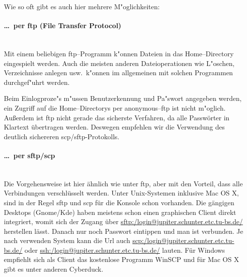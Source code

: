 Wie so oft gibt es auch hier mehrere M"oglichkeiten: 

\paragraph{\dots\ per  ftp (File Transfer Protocol)} \ \\
Mit einem beliebigen \glossar ftp--Programm k"onnen Dateien in das
\glossar Home--Directory eingespielt werden. Auch die meisten anderen
Dateioperationen wie L"oschen, Verzeichnisse anlegen usw.\  k"onnen im
allgemeinen mit solchen Programmen durchgef"uhrt werden.

Beim Einlogproze"s m"ussen Benutzerkennung und Pa"swort angegeben werden, ein
Zugriff auf die \glossar Home--Directorys per anonymous--ftp ist nicht
m"oglich. Außerdem ist ftp nicht gerade das sicherste Verfahren, da
alle Passwörter in Klartext übertragen werden. Deswegen empfehlen wir
die Verwendung des deutlich sichereren scp/sftp-Protokolls.
\paragraph{\dots\ per sftp/scp} \ \\
Die Vorgehensweise ist hier ähnlich wie unter ftp, aber mit den
Vorteil, dass alle Verbindungen verschlüsselt werden. Unter
Unix-Systemen inklusive Mac OS X, sind in der Regel sftp und scp für
die Konsole schon vorhanden. Die gängigen Desktops (Gnome/Kde) haben
meistens schon einen graphischen Client direkt integriert, womit sich
der Zugang über \url{sftp:/login@jupiter.schunter.etc.tu-bs.de/}
herstellen lässt. Danach nur noch Passwort eintippen und man ist
verbunden. Je nach verwenden System kann die Url auch
\url{scp:/login@jupiter.schunter.etc.tu-bs.de/} oder
\url{ssh:/login@jupiter.schunter.etc.tu-bs.de/} lauten. 
Für Windows empfiehlt sich als Client das kostenlose Programm WinSCP
und für Mac OS X gibt es unter anderen Cyberduck. 



